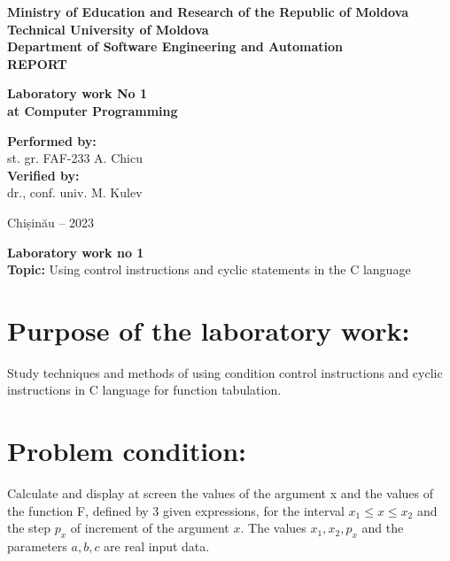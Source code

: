 \documentclass[a4paper, 11p]{article}
\begin{document}
\begin{titlepage}
    \centering
    \LARGE

    \vspace*{.5in}
    \textbf{Ministry of Education and Research of the Republic of Moldova} \\
    \textbf{Technical University of Moldova} \\
    
    \vspace*{.2in}
    \textbf{Department of Software Engineering and Automation} \\
    
    \vspace*{1in}
    { \Huge
      \textbf{REPORT}}

    \vspace*{.3in}
    \textbf{Laboratory work No 1} \\
    \textbf{at Computer Programming} \\
    
    \vfill
    { \raggedright
        \textbf{Performed by:} \\
        st. gr. FAF-233 \hfill A. Chicu \\
        
        \vspace*{1cm}
        \textbf{Verified by:} \\
        dr., conf. univ. \hfill M. Kulev \\
    }
    
    \vfill

    Chișinău -- 2023 
    
\end{titlepage}

\begin{center}
   \Large
   \textbf{Laboratory work no 1} \\
   \textbf{Topic:} Using control instructions and cyclic statements in the C language
\end{center}

\section{Purpose of the laboratory work:}
Study techniques and methods of using 
condition control instructions and cyclic instructions in 
C language for function tabulation. 

\section{Problem condition:}
Calculate and display at 
screen the values of the argument x and the values of the function F, defined by 3 
given expressions, for the interval \( x_1 \le  x \le  x_2 \) and the step \( p_x \) of 
increment of the argument \( x \). The values \( x_1, x_2, p_x \) and the parameters \( a, b, c \) are real input data.
\end{document}
